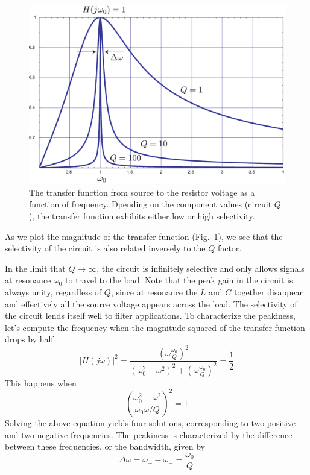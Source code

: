 \begin{figure}
\begin{center}
\includegraphics[width=.65\columnwidth]{transferrlc}
\end{center}
\caption{The transfer function from source to the resistor voltage as a function of frequency.  Dpending on the component values (circuit $Q$), the transfer function exhibits either low or high selectivity. } \label{fig:transferrlc}
\end{figure}

As we plot the magnitude of the
transfer function (Fig.~\ref{fig:transferrlc}), we see that the selectivity of the circuit is also related inversely to the $Q$ factor.  

 In the limit that $Q \rightarrow \infty$, the
circuit is infinitely selective and only allows signals at resonance
$\omega_0$ to travel to the load.  
 Note that the peak gain in the circuit is
always unity, regardless of $Q$, since at resonance the $L$ and $C$ together
disappear and effectively all the source voltage appears across the load.
 The selectivity of the circuit lends itself well to filter
  applications.  To characterize the peakiness, let's compute the
  frequency when the magnitude squared of the transfer function drops
  by half
\begin{equation}
    | H(j\omega)|^2 = \frac{ \left(\omega \frac{\omega_0}{Q} \right)^2}
                      {\left( \omega_0^2 - \omega^2\right)^2 + 
                       \left( \omega \frac{\omega_0}{Q}\right)^2} =
		      \frac{1}{2}
\end{equation}
This happens when 
%
\begin{equation}
     \left( \frac{\omega_0^2 - \omega^2}{\omega_0\omega / Q}\right)^2 = 1
\end{equation}
%
 Solving the above equation yields four
solutions, corresponding to two positive and two negative frequencies.  The
peakiness is characterized by the difference between these frequencies, or the
bandwidth, given by
%
\begin{equation} \label{eq:3db}
     \Delta\omega = \omega_+ - \omega_- = \frac{\omega_0}{Q}
\end{equation}
%




